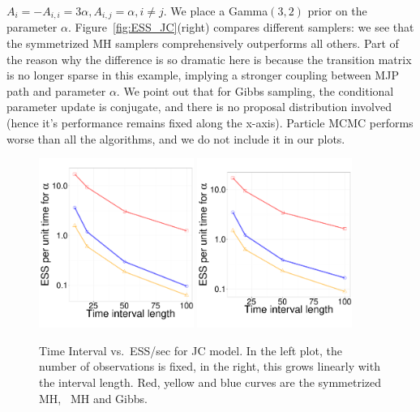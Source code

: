{$A_i = -A_{i,i} = 3\alpha, A_{i, j} = \alpha,i \neq j.$
We place a Gamma$(3,2)$ prior on the parameter $\alpha$.
Figure~\ref{fig:ESS_JC}(right) compares different samplers: we see that the
symmetrized MH samplers comprehensively outperforms all others.
Part of the reason why the difference is so dramatic here is because the
transition matrix is no longer sparse in this example, implying a stronger
coupling between MJP path and parameter $\alpha$. We point out that for Gibbs
sampling, the conditional parameter update is conjugate, and there is no
proposal distribution involved (hence it's performance remains fixed along
the x-axis). Particle MCMC performs worse
than all the algorithms, and we do not include it in our plots.
  \begin{figure}%
  \centering
  \begin{minipage}[!hp]{0.73\linewidth}
  \centering
    \includegraphics [width=0.45\textwidth, angle=0]{figs/ESS_vs_t_alpha_JC.pdf}
	\vspace{.3in}
  \centering
    \includegraphics [width=0.45\textwidth, angle=0]{figs/ESS_vs_t_alpha_fixobservation_JC.pdf}
  \end{minipage}
  \begin{minipage}[!hp]{0.25\linewidth}
    \caption{Time Interval vs.\ ESS/sec for JC model. In the left plot, the number of 
    observations is fixed, in the right, this grows linearly with the
  interval length. Red, yellow and blue curves are the symmetrized MH,
  \naive\ MH and Gibbs. }
	\label{fig:jc_model_vs_t}
  \end{minipage}
  \vspace{-.4in}
  \end{figure}

}
